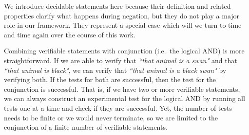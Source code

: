 \documentclass[11pt,letterpaper,fleqn]{memoir} %
\begin{document}
We introduce decidable statements here because their definition and related properties clarify what happens during negation, but they do not play a major role in our framework. They represent a special case which will we turn to time and time again over the course of this work.

Combining verifiable statements with conjunction (i.e.~the logical AND) is more straightforward. If we are able to verify that \emph{``that animal is a swan"} and that \emph{``that animal is black"}, we can verify that \emph{``that animal is a black swan"} by verifying both. If the tests for both are successful, then the test for the conjunction is successful. That is, if we have two or more verifiable statements, we can always construct an experimental test for the logical AND by running all tests one at a time and check if they are successful. Yet, the number of tests needs to be finite or we would never terminate, so we are limited to the conjunction of a finite number of verifiable statements.
\end{document}
